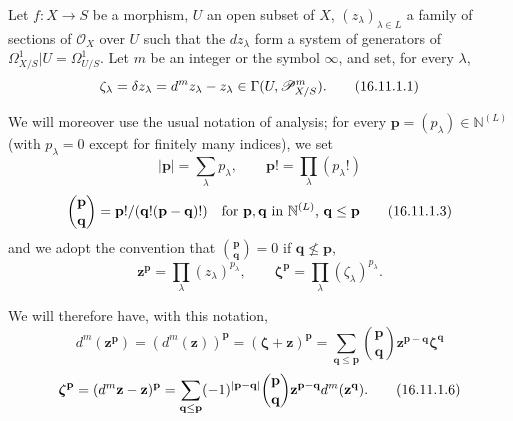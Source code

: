 \begin{env}[16.11.1]
\label{IV.16.11.1}
Let $f:X\to S$ be a morphism, $U$ an open subset of $X$,
$(z_\lambda)_{\lambda\in L}$ a family of sections of $\mathcal{O}_X$
over $U$ such that the $dz_\lambda$ form a system of generators
of $\varOmega_{X/S}^1|U=\varOmega_{U/S}^1$. Let $m$ be an integer or the symbol
$\infty$, and set, for every $\lambda$,
\[
  \zeta_\lambda=\delta z_\lambda=d^m z_\lambda- z_\lambda
  \in\Gamma(U,\mathscr{P}_{X/S}^m).
  \tag{16.11.1.1}
  \label{IV.16.11.1.1}
\]

We will moreover use the usual notation of analysis; for every
$\mathbf{p}=(p_\lambda)\in\mathbb{N}^{(L)}$ (with $p_\lambda=0$ except for
finitely many indices), we set
\[
  |\mathbf{p}|=\sum_\lambda p_\lambda,
  \qquad \mathbf{p}!=\prod_\lambda(p_\lambda!)
  \tag{16.11.1.2}
  \label{IV.16.11.1.2}
\]
\[
  \binom{\mathbf{p}}{\mathbf{q}}
  =\mathbf{p}!/(\mathbf{q}!(\mathbf{p}-\mathbf{q})!)
  \quad\text{for $\mathbf{p},\mathbf{q}$ in $\mathbb{N}^{(L)}$,
  $\mathbf{q}\leq\mathbf{p}$}
  \tag{16.11.1.3}
  \label{IV.16.11.1.3}
\]
and we adopt the convention that $\binom{\mathbf{p}}{\mathbf{q}}=0$ if
$\mathbf{q}\nleq\mathbf{p}$,
\[
  \mathbf{z}^{\mathbf{p}}=\prod_\lambda(z_\lambda)^{p_\lambda},
  \qquad
  \boldsymbol{\zeta}^{\mathbf{p}}=\prod_\lambda(\zeta_\lambda)^{p_\lambda}.
  \tag{16.11.1.4}
  \label{IV.16.11.1.4}
\]

We will therefore have, with this notation,
\[
  d^m(\mathbf{z}^{\mathbf{p}})
  =(d^m(\mathbf{z}))^{\mathbf{p}}
  =(\boldsymbol{\zeta}+\mathbf{z})^{\mathbf{p}}
  =\sum_{\mathbf{q}\leq\mathbf{p}}
    \binom{\mathbf{p}}{\mathbf{q}}
    \mathbf{z}^{\mathbf{p}-\mathbf{q}}\boldsymbol{\zeta}^{\mathbf{q}}
  \tag{16.11.1.5}
  \label{IV.16.11.1.5}
\]
\[
  \boldsymbol{\zeta}^{\mathbf{p}}
  =(d^m\mathbf{z}-\mathbf{z})^{\mathbf{p}}
  =\sum_{\mathbf{q}\leq\mathbf{p}}
    (- 1)^{|\mathbf{p}-\mathbf{q}|}
    \binom{\mathbf{p}}{\mathbf{q}}
    \mathbf{z}^{\mathbf{p}-\mathbf{q}}d^m(\mathbf{z}^{\mathbf{q}}).
  \tag{16.11.1.6}
  \label{IV.16.11.1.6}
\]


\end{env}
